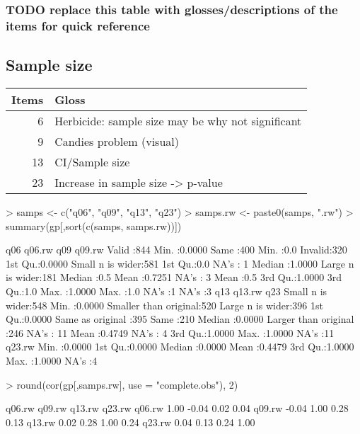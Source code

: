 \documentclass[11pt]{article}
\begin{document}
\subsubsection{{\bfseries\sffamily TODO} replace this table with glosses/descriptions of the items for quick reference}
\label{sec-3-1-1}

\subsection{Sample size}
\label{sec-3-2}
\begin{center}
\begin{tabular}{rl}
\textbf{Items} & \textbf{Gloss}\\
\hline
6 & Herbicide: sample size may be why not significant\\
9 & Candies problem (visual)\\
13 & CI/Sample size\\
23 & Increase in sample size -> p-value\\
\end{tabular}
\end{center}

\begin{Schunk}
\begin{Sinput}
> samps <- c("q06", "q09", "q13", "q23")
> samps.rw <- paste0(samps, ".rw")
> summary(gp[,sort(c(samps, samps.rw))])
\end{Sinput}
\begin{Soutput}
      q06          q06.rw                     q09          q09.rw   
 Valid  :844   Min.   :0.0000   Same            :400   Min.   :0.0  
 Invalid:320   1st Qu.:0.0000   Small n is wider:581   1st Qu.:0.0  
 NA's   :  1   Median :1.0000   Large n is wider:181   Median :0.5  
               Mean   :0.7251   NA's            :  3   Mean   :0.5  
               3rd Qu.:1.0000                          3rd Qu.:1.0  
               Max.   :1.0000                          Max.   :1.0  
               NA's   :1                               NA's   :3    
               q13          q13.rw                          q23     
 Small n is wider:548   Min.   :0.0000   Smaller than original:520  
 Large n is wider:396   1st Qu.:0.0000   Same as original     :395  
 Same            :210   Median :0.0000   Larger than original :246  
 NA's            : 11   Mean   :0.4749   NA's                 :  4  
                        3rd Qu.:1.0000                              
                        Max.   :1.0000                              
                        NA's   :11                                  
     q23.rw      
 Min.   :0.0000  
 1st Qu.:0.0000  
 Median :0.0000  
 Mean   :0.4479  
 3rd Qu.:1.0000  
 Max.   :1.0000  
 NA's   :4       
\end{Soutput}
\begin{Sinput}
> round(cor(gp[,samps.rw], use = "complete.obs"), 2)
\end{Sinput}
\begin{Soutput}
       q06.rw q09.rw q13.rw q23.rw
q06.rw   1.00  -0.04   0.02   0.04
q09.rw  -0.04   1.00   0.28   0.13
q13.rw   0.02   0.28   1.00   0.24
q23.rw   0.04   0.13   0.24   1.00
\end{Soutput}
\end{Schunk}
\end{document}
